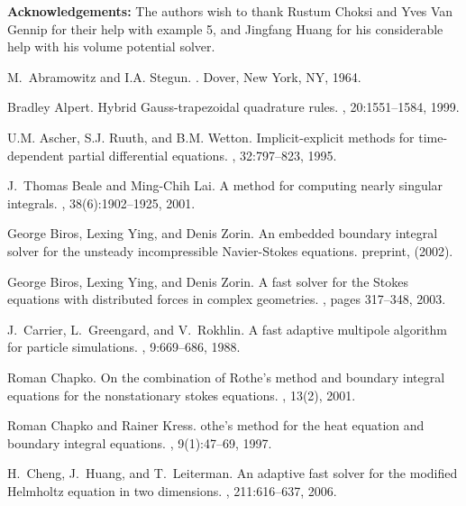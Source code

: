 \documentclass[preprint,12pt]{elsarticle}
\begin{document}
\noindent
{\bf Acknowledgements:}
 The authors wish to thank Rustum Choksi and Yves Van Gennip for their help with example 5, and Jingfang Huang for his considerable help with his volume potential solver. 

\begin{thebibliography}{10}

M.~Abramowitz and I.A. Stegun.
.
\newblock Dover, New York, NY, 1964.

Bradley Alpert.
\newblock Hybrid Gauss-trapezoidal quadrature rules.
, 20:1551--1584, 1999.

U.M. Ascher, S.J. Ruuth, and B.M. Wetton.
\newblock Implicit-explicit methods for time-dependent partial differential
  equations.
, 32:797--823, 1995.

J.~Thomas Beale and Ming-Chih Lai.
\newblock A method for computing nearly singular integrals.
, 38(6):1902--1925, 2001.

George Biros, Lexing Ying, and Denis Zorin.
\newblock An embedded boundary integral solver for the unsteady incompressible
  {N}avier-{S}tokes equations.
\newblock preprint, (2002).

George Biros, Lexing Ying, and Denis Zorin.
\newblock A fast solver for the Stokes equations with distributed forces in
  complex geometries.
, pages 317--348, 2003.

J.~Carrier, L.~Greengard, and V.~Rokhlin.
\newblock A fast adaptive multipole algorithm for particle simulations.
, 9:669--686, 1988.

Roman Chapko.
\newblock On the combination of {R}othe's method and boundary integral
  equations for the nonstationary stokes equations.
, 13(2), 2001.

Roman Chapko and Rainer Kress.
othe's method for the heat equation and boundary integral
  equations.
, 9(1):47--69, 1997.

H.~Cheng, J.~Huang, and T.~Leiterman.
\newblock An adaptive fast solver for the modified Helmholtz equation in two
  dimensions.
, 211:616--637, 2006.


\end{thebibliography}
\end{document}
